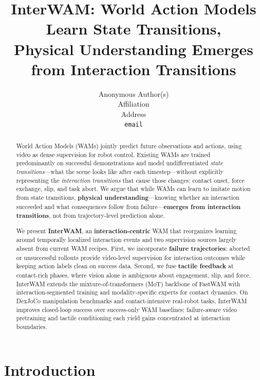 \documentclass{article}
\begin{document}
\title{InterWAM: World Action Models Learn State Transitions,\\Physical Understanding Emerges from Interaction Transitions}

\author{Anonymous Author(s) \\
Affiliation \\
Address \\
\texttt{email} \\
}

\maketitle

\begin{abstract}
World Action Models (WAMs) jointly predict future observations and actions, using video as dense supervision for robot control.
Existing WAMs are trained predominantly on successful demonstrations and model undifferentiated \emph{state transitions}---what the scene looks like after each timestep---without explicitly representing the \emph{interaction transitions} that cause those changes: contact onset, force exchange, slip, and task abort.
We argue that while WAMs can learn to imitate motion from state transitions, \textbf{physical understanding}---knowing whether an interaction succeeded and what consequences follow from failure---\textbf{emerges from interaction transitions}, not from trajectory-level prediction alone.

We present \textbf{InterWAM}, an \textbf{interaction-centric} WAM that reorganizes learning around temporally localized interaction events and two supervision sources largely absent from current WAM recipes.
First, we incorporate \textbf{failure trajectories}: aborted or unsuccessful rollouts provide video-level supervision for interaction outcomes while keeping action labels clean on success data.
Second, we fuse \textbf{tactile feedback} at contact-rich phases, where vision alone is ambiguous about engagement, slip, and force.
InterWAM extends the mixture-of-transformers (MoT) backbone of FastWAM with interaction-segmented training and modality-specific experts for contact dynamics.
On DexJoCo manipulation benchmarks and contact-intensive real-robot tasks, InterWAM improves closed-loop success over success-only WAM baselines; failure-aware video pretraining and tactile conditioning each yield gains concentrated at interaction boundaries.
\end{abstract}

\section{Introduction}
\label{sec:intro}
\end{document}
